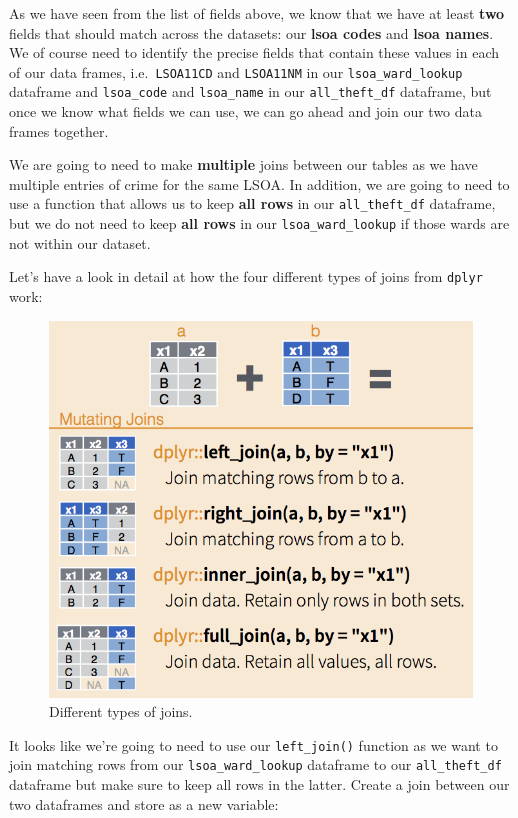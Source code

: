 \documentclass[
]{book}
\begin{document}
As we have seen from the list of fields above, we know that we have at least \textbf{two} fields that should match across the datasets: our \textbf{lsoa codes} and \textbf{lsoa names}. We of course need to identify the precise fields that contain these values in each of our data frames, i.e.~\texttt{LSOA11CD} and \texttt{LSOA11NM} in our \texttt{lsoa\_ward\_lookup} dataframe and \texttt{lsoa\_code} and \texttt{lsoa\_name} in our \texttt{all\_theft\_df} dataframe, but once we know what fields we can use, we can go ahead and join our two data frames together.

We are going to need to make \textbf{multiple} joins between our tables as we have multiple entries of crime for the same LSOA. In addition, we are going to need to use a function that allows us to keep \textbf{all rows} in our \texttt{all\_theft\_df} dataframe, but we do not need to keep \textbf{all rows} in our \texttt{lsoa\_ward\_lookup} if those wards are not within our dataset.

Let's have a look in detail at how the four different types of joins from \texttt{dplyr} work:

\begin{figure}

{\centering \includegraphics[width=0.9\linewidth]{images/w05/dplyr-joins} 

}

\caption{Different types of joins.}\label{fig:05-dplyr}
\end{figure}

It looks like we're going to need to use our \texttt{left\_join()} function as we want to join matching rows from our \texttt{lsoa\_ward\_lookup} dataframe to our \texttt{all\_theft\_df} dataframe but make sure to keep all rows in the latter. Create a join between our two dataframes and store as a new variable:
\end{document}
